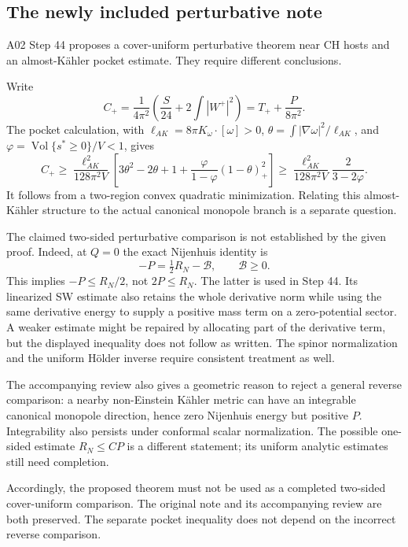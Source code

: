 \documentclass[
]{article}
\begin{document}
\hypertarget{the-newly-included-perturbative-note}{%
\subsection{The newly included perturbative
note}\label{the-newly-included-perturbative-note}}

A02 Step 44 proposes a cover-uniform perturbative theorem near CH hosts
and an almost-Kähler pocket estimate. They require different
conclusions.

Write \[
 C_+=\frac1{4\pi^2}\left(\frac S{24}+2\int|W^+|^2\right)
     =T_++\frac{P}{8\pi^2}.
\] The pocket calculation, with
\(\ell_{AK}=8\pi K_\omega\cdot[\omega]>0\),
\(\theta=\int|\nabla\omega|^2/\ell_{AK}\), and
\(\varphi=\operatorname{Vol}\{s^*\ge0\}/V<1\), gives \[
 C_+\ge\frac{\ell_{AK}^2}{128\pi^2V}
 \left[3\theta^2-2\theta+1+
 \frac{\varphi}{1-\varphi}(1-\theta)_+^2\right]
 \ge\frac{\ell_{AK}^2}{128\pi^2V}\frac{2}{3-2\varphi}.
\] It follows from a two-region convex quadratic minimization. Relating
this almost-Kähler structure to the actual canonical monopole branch is
a separate question.

The claimed two-sided perturbative comparison is not established by the
given proof. Indeed, at \(Q=0\) the exact Nijenhuis identity is \[
 -P=\tfrac12R_N-\mathcal B,\qquad\mathcal B\ge0.
\] This implies \(-P\le R_N/2\), not \(2P\le R_N\). The latter is used
in Step 44. Its linearized SW estimate also retains the whole derivative
norm while using the same derivative energy to supply a positive mass
term on a zero-potential sector. A weaker estimate might be repaired by
allocating part of the derivative term, but the displayed inequality
does not follow as written. The spinor normalization and the uniform
Hölder inverse require consistent treatment as well.

The accompanying review also gives a geometric reason to reject a
general reverse comparison: a nearby non-Einstein Kähler metric can have
an integrable canonical monopole direction, hence zero Nijenhuis energy
but positive \(P\). Integrability also persists under conformal scalar
normalization. The possible one-sided estimate \(R_N\le CP\) is a
different statement; its uniform analytic estimates still need
completion.

Accordingly, the proposed theorem must not be used as a completed
two-sided cover-uniform comparison. The original note and its
accompanying review are both preserved. The separate pocket inequality
does not depend on the incorrect reverse comparison.
\end{document}
